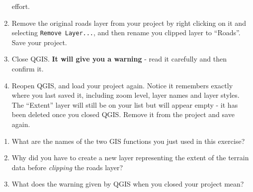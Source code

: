 \documentclass[
  letterpaper,
  DIV=11,
  numbers=noendperiod]{scrreprt}
\begin{document}
\begin{enumerate}
  effort.
\item
  Remove the original roads layer from your project by right clicking on
  it and selecting \texttt{Remove\ Layer...}, and then rename you
  clipped layer to ``Roads''. Save your project.
\item
  Close QGIS. \textbf{It will give you a warning} - read it carefully
  and then confirm it.
\item
  Reopen QGIS, and load your project again. Notice it remembers exactly
  where you last saved it, including zoom level, layer names and layer
  styles. The ``Extent'' layer will still be on your list but will
  appear empty - it has been deleted once you closed QGIS. Remove it
  from the project and save again.
\end{enumerate}

\begin{tcolorbox}[enhanced jigsaw, coltitle=black, toprule=.15mm, breakable, opacitybacktitle=0.6, left=2mm, colback=white, leftrule=.75mm, rightrule=.15mm, colbacktitle=quarto-callout-important-color!10!white, toptitle=1mm, titlerule=0mm, colframe=quarto-callout-important-color-frame, arc=.35mm, bottomtitle=1mm, opacityback=0, bottomrule=.15mm, title=\textcolor{quarto-callout-important-color}{\faExclamation}\hspace{0.5em}{Stop and Think}]

\begin{enumerate}
\def\labelenumi{\alph{enumi})}
\item
  What are the names of the two GIS functions you just used in this
  exercise?
\item
  Why did you have to create a new layer representing the extent of the
  terrain data before \emph{clipping} the roads layer?
\item
  What does the warning given by QGIS when you closed your project mean?
\end{enumerate}

\end{tcolorbox}
\end{document}
